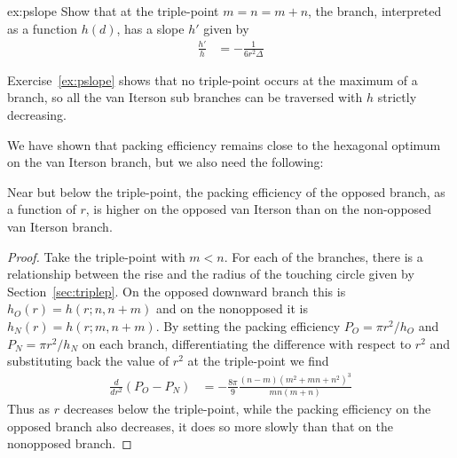 \begin{jExercise}{ex:pslope}
	Show that at the triple-point  $m=n=m+n$, the  branch, interpreted as a function $h(d)$, has a slope $h'$ given by 
	\begin{align}
		\frac{h'}{h} &= - \frac{1}{6 r^2 \Delta}
	\end{align}
\end{jExercise}
Exercise~\ref{ex:pslope} shows that no triple-point occurs at the maximum of a branch, so all the van Iterson sub branches can be traversed with $h$ strictly decreasing. 


We have shown that packing efficiency remains close to the hexagonal optimum on the van Iterson branch, but we also need the following:
\begin{theorem}
	Near but below the triple-point, the packing efficiency of the opposed branch, as a function of $r$, is higher on the opposed van Iterson than on the non-opposed van Iterson branch.
\end{theorem}
\begin{proof}
	Take the triple-point  with $m<n$. For each of the branches, there is a relationship between the rise and the radius of the touching circle given by Section~\ref{sec:triplep}. On the 
	opposed downward branch  this is $h_O(r)= h(r;n,n+m)$ and on the nonopposed   it is $h_N(r)=h(r;m,n+m)$. By setting the 
	packing efficiency  $P_O=\pi r^2/h_O$ and $P_N=\pi r^2/h_N$ on each branch, differentiating the difference with respect to $r^2$ and substituting back the value of $r^2$ at the triple-point we find
	\begin{align}
		\frac{d}{dr^2}(P_O-P_N) &= - \frac{8\pi}{9}\frac{(n- m )  (m^2+m n+n^2)^3}{mn(m+n)}
	\end{align}
	Thus as $r$ decreases below the triple-point, while the packing efficiency on the opposed branch also decreases, it does so more slowly than that on the nonopposed branch.  
\end{proof}




